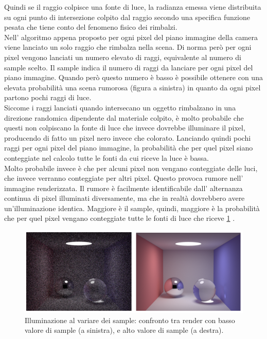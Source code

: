 Quindi se il raggio colpisce una fonte di luce, la radianza emessa viene distribuita su ogni punto di intersezione colpito dal raggio secondo una specifica funzione pesata che tiene conto del fenomeno fisico dei rimbalzi.
\\
Nell’ algoritmo appena proposto per ogni pixel del piano immagine della camera viene lanciato un solo raggio che rimbalza nella scena. Di norma però per ogni pixel vengono lanciati un numero elevato di raggi, equivalente al numero di sample scelto. Il sample indica il numero di raggi da lanciare per ogni pixel del piano immagine.
Quando però questo numero è basso è possibile ottenere con una elevata probabilità una scena rumorosa (figura a sinistra) in quanto da ogni pixel partono pochi raggi di luce.
\\
Siccome i raggi lanciati quando intersecano un oggetto rimbalzano in una direzione randomica dipendente dal materiale colpito, è molto probabile che questi non colpiscano la fonte di luce che invece dovrebbe illuminare il pixel, producendo di fatto un pixel nero invece che colorato. 
Lanciando quindi pochi raggi per ogni pixel del piano immagine, la probabilità che per quel pixel siano conteggiate nel calcolo tutte le fonti da cui riceve la luce è bassa.
\\
Molto probabile invece è che per alcuni pixel non vengano conteggiate delle luci, che invece verranno conteggiate per altri pixel. Questo provoca rumore nell’ immagine renderizzata. 
Il rumore è facilmente identificabile dall’ alternanza continua di pixel illuminati diversamente, ma che in realtà dovrebbero avere un’illuminazione identica.
Maggiore è il sample, quindi, maggiore è la probabilità che per quel pixel vengano conteggiate tutte le fonti di luce che riceve \ref{fig:stato_arte_effetto_sampling} .
\\
\begin{figure}[htb]
 \centering
 \includegraphics[width=0.9\linewidth]{images/chapter_stato_arte/stato_arte_effetto_sampling.png}\hfill
 \caption[Illuminazione al variare dei sample]{Illuminazione al variare dei sample: confronto tra render con basso valore di sample (a sinistra), e alto valore di sample (a destra).}
 \label{fig:stato_arte_effetto_sampling}
\end{figure}
